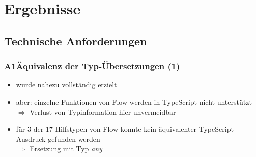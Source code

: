   \section{Ergebnisse}


    \subsection{Technische Anforderungen}

      \begin{frame}
        \frametitle{A1\hspace{0.75em}Äquivalenz der Typ-Übersetzungen (1)}
        \begin{itemize}
          \item wurde nahezu vollständig erzielt
          \item aber: einzelne Funktionen von Flow werden in TypeScript nicht unterstützt\\
            \smallskip
            $\Rightarrow$ Verlust von Typinformation hier unvermeidbar
          \item für 3 der 17 Hilfstypen von Flow konnte kein äquivalenter TypeScript-Ausdruck gefunden werden\\
            \smallskip
            $\Rightarrow$ Ersetzung mit Typ \textit{any}
        \end{itemize}
      \end{frame}

